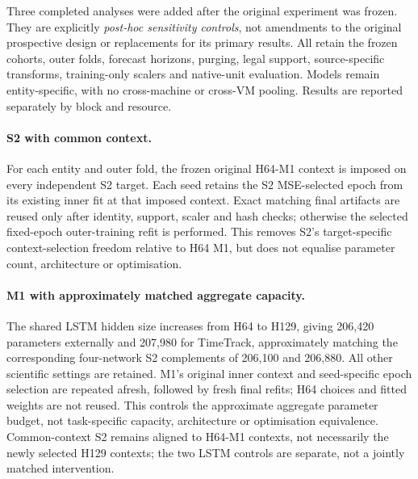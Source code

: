 \documentclass[a4paper,fleqn]{cas-dc}
\begin{document}
Three completed analyses were added after the original experiment was
frozen. They are explicitly \emph{post-hoc sensitivity
controls}, not amendments to the original prospective design or replacements
for its primary results. All retain the frozen cohorts, outer folds,
forecast horizons, purging, legal support, source-specific transforms,
training-only scalers and native-unit evaluation. Models remain
entity-specific, with no cross-machine or cross-VM pooling. Results are
reported separately by block and resource.

\paragraph{S2 with common context.}
For each entity and outer fold, the frozen original H64-M1 context is imposed
on every independent S2 target. Each seed retains the S2 MSE-selected epoch
from its existing inner fit at that imposed context. Exact matching final
artifacts are reused only after identity, support, scaler and hash checks;
otherwise the selected fixed-epoch outer-training refit is performed.
This removes S2's target-specific context-selection freedom relative to
H64 M1, but does not equalise parameter count, architecture or optimisation.

\paragraph{M1 with approximately matched aggregate capacity.}
The shared LSTM hidden size increases from H64 to H129, giving 206,420
parameters externally and 207,980 for TimeTrack, approximately matching the
corresponding four-network S2 complements of 206,100 and 206,880. All other
scientific settings are retained. M1's original inner context and
seed-specific epoch selection are repeated afresh, followed by fresh final
refits; H64 choices and fitted weights are not reused. This controls the
approximate aggregate parameter budget, not task-specific capacity,
architecture or optimisation equivalence. Common-context S2 remains aligned
to H64-M1 contexts, not necessarily the newly selected H129 contexts; the
two LSTM controls are separate, not a jointly matched intervention.
\end{document}
